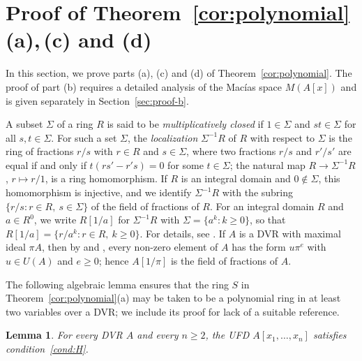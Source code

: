 \documentclass[12pt,reqno,a4paper]{amsart}
\theoremstyle{plain}
\newtheorem{lemma}[theorem]{Lemma}
\theoremstyle{definition}
\begin{document}
\section{Proof of \texorpdfstring{Theorem~\ref{cor:polynomial}\,(a),\,(c) and (d)}{}}\label{sec:polynomial}
In this section, we prove parts (a), (c) and (d) of Theorem~\ref{cor:polynomial}. The proof of part (b) requires a detailed analysis of the Mac\'ias space $M(A[x])$ and is given separately in Section~\ref{sec:proof-b}.

A subset $\Sigma$ of a ring $R$ is said to be \emph{multiplicatively closed} if $1\in\Sigma$ and $st\in\Sigma$ for all $s,t\in\Sigma$. For such a set $\Sigma$, the \emph{localization} $\Sigma^{-1}R$ of $R$ with respect to $\Sigma$ is the ring of fractions $r/s$ with $r\in R$ and $s\in\Sigma$, where two fractions $r/s$ and $r'/s'$ are equal if and only if $t(rs'-r's)=0$ for some $t\in\Sigma$; the natural map $R\to\Sigma^{-1}R$, $r\mapsto r/1$, is a ring homomorphism. If $R$ is an integral domain and $0\notin\Sigma$, this homomorphism is injective, and we identify $\Sigma^{-1}R$ with the subring $\{r/s:r\in R,\ s\in\Sigma\}$ of the field of fractions of $R$. For an integral domain $R$ and $a\in R^0$, we write $R[1/a]$ for $\Sigma^{-1}R$ with $\Sigma=\{a^k:k\geq0\}$, so that $R[1/a]=\{r/a^k:r\in R,\ k\geq0\}$. For details, see \cite[Chapter~3]{AtiyahMacdonald}. If $A$ is a DVR with maximal ideal $\pi A$, then by \cite[Section~5.2, Theorem~1]{Gopalakrishnan} and \cite[Proposition~9.2]{AtiyahMacdonald}, every non-zero element of $A$ has the form $u\pi^e$ with $u\in U(A)$ and $e\geq0$; hence $A[1/\pi]$ is the field of fractions of $A$. 

The following algebraic lemma ensures that the ring $S$ in Theorem~\ref{cor:polynomial}(a) may be taken to be a polynomial ring in at least two variables over a DVR; we include its proof for lack of a suitable reference.

\begin{lemma}\label{lem:H-several}
For every DVR $A$ and every $n\geq2$, the UFD $A[x_1,\dots,x_n]$ satisfies condition~\ref{cond:H}.
\end{lemma}
\end{document}
